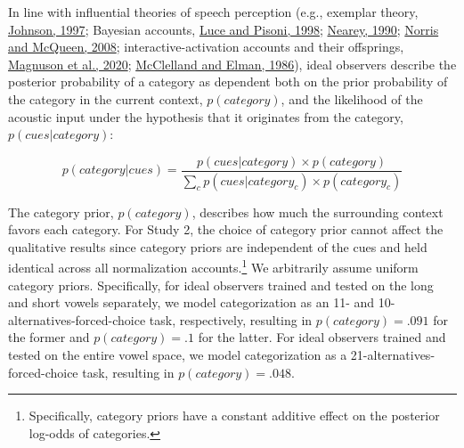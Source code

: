 \documentclass[utf8]{frontiersSCNS}
\begin{document}
In line with influential theories of speech perception (e.g., exemplar theory, \protect\hyperlink{ref-johnson1997}{Johnson, 1997}; Bayesian accounts, \protect\hyperlink{ref-luce-pisoni1998}{Luce and Pisoni, 1998}; \protect\hyperlink{ref-nearey1990}{Nearey, 1990}; \protect\hyperlink{ref-norris-mcqueen2008}{Norris and McQueen, 2008}; interactive-activation accounts and their offsprings, \protect\hyperlink{ref-magnuson2020}{Magnuson et al., 2020}; \protect\hyperlink{ref-mcclelland-elman1986}{McClelland and Elman, 1986}), ideal observers describe the posterior probability of a category as dependent both on the prior probability of the category in the current context, \(p(category)\), and the likelihood of the acoustic input under the hypothesis that it originates from the category, \(p(cues|category)\):

\begin{equation}
 p(category|cues) = \frac{p(cues|category) \times p(category)}{\sum_c p(cues|category_c) \times p(category_c)} \label{eq:Bayes-rule}
\end{equation}

The category prior, \(p(category)\), describes how much the surrounding context favors each category. For Study 2, the choice of category prior cannot affect the qualitative results since category priors are independent of the cues and held identical across all normalization accounts.\footnote{Specifically, category priors have a constant additive effect on the posterior log-odds of categories.} We arbitrarily assume uniform category priors. Specifically, for ideal observers trained and tested on the long and short vowels separately, we model categorization as an 11- and 10-alternatives-forced-choice task, respectively, resulting in \(p(category) = .091\) for the former and \(p(category) = .1\) for the latter. For ideal observers trained and tested on the entire vowel space, we model categorization as a 21-alternatives-forced-choice task, resulting in \(p(category) = .048\).
\end{document}
